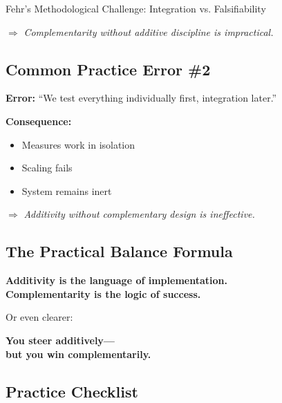 \begin{chapter}{Fehr's Methodological Challenge: Integration vs. Falsifiability}
\begin{tcolorbox}[colback=red!10!white,colframe=red!75!black]
$\Rightarrow$ \textit{Complementarity without additive discipline is impractical.}
\end{tcolorbox}

\subsection{Common Practice Error \#2}

\begin{tcolorbox}[colback=red!10!white,colframe=red!75!black]
\textbf{Error:} ``We test everything individually first, integration later.''

\textbf{Consequence:}
\begin{itemize}[noitemsep]
    \item Measures work in isolation
    \item Scaling fails
    \item System remains inert
\end{itemize}

$\Rightarrow$ \textit{Additivity without complementary design is ineffective.}
\end{tcolorbox}

\subsection{The Practical Balance Formula}

\begin{tcolorbox}[colback=blue!5!white,colframe=blue!75!black]
\begin{center}
\large
\textbf{Additivity is the language of implementation.}\\
\textbf{Complementarity is the logic of success.}
\end{center}
\end{tcolorbox}

Or even clearer:

\begin{tcolorbox}[colback=green!5!white,colframe=green!75!black]
\begin{center}
\Large
\textbf{You steer additively---}\\
\textbf{but you win complementarily.}
\end{center}
\end{tcolorbox}

\subsection{Practice Checklist}


\end{chapter}
